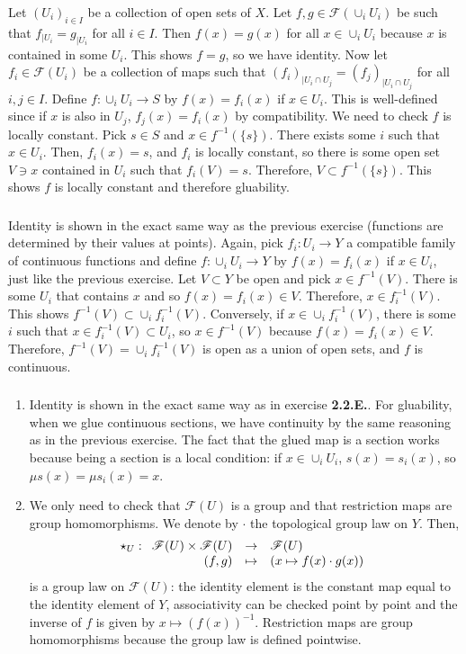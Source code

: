 \documentclass{article}
\newcommand{\applic}[4]{\begin{array}[t]{rcl}
#1 & \to & #2 \\
#3 & \mapsto & #4
\end{array}}
\newcommand{\Fsheaf}{\mathscr{F}}
\newcommand{\exercise}{\subsubsection} %
\begin{document}
\exercise{} Let $(U_i)_{i\in I}$ be a collection of open sets of $X$. Let $f,g \in \Fsheaf(\cup_i U_i)$ be such that $f_{\mid U_i} = g_{\mid U_i}$ for all $i \in I$. Then $f(x) = g(x)$ for all $x \in \cup_i U_i$ because $x$ is contained in some $U_i$. This shows $f = g$, so we have identity. Now let $f_i \in \Fsheaf(U_i)$ be a collection of maps such that $(f_i)_{\mid U_i \cap U_j} = (f_j)_{\mid U_i \cap U_j}$ for all $i,j \in I$. Define $f : \cup_i U_i \to S$ by $f(x) = f_i (x)$ if $x \in U_i$. This is well-defined since if $x$ is also in $U_j$, $f_j(x) = f_i(x)$ by compatibility. We need to check $f$ is locally constant. Pick $s \in S$ and $x \in f^{-1}(\{s\})$. There exists some $i$ such that $x \in U_i$. Then, $f_i(x) = s$, and $f_i$ is locally constant, so there is some open set $V  \ni x$ contained in $U_i$ such that $f_i(V) = s$. Therefore, $V \subset f^{-1}(\{s\})$. This shows $f$ is locally constant and therefore gluability.

\exercise{} Identity is shown in the exact same way as the previous exercise (functions are determined by their values at points). Again, pick $f_i : U_i \to Y$ a compatible family of continuous functions and define $f : \cup_i U_i \to Y$ by $f(x) = f_i(x)$ if $x \in U_i$, just like the previous exercise. Let $V \subset Y$ be open and pick $x \in f^{-1}(V)$. There is some $U_i$ that contains $x$ and so $f(x) = f_i(x) \in V$. Therefore, $x \in f_i^{-1}(V)$. This shows $f^{-1}(V) \subset \cup_i f_i^{-1}(V)$. Conversely, if $x \in \cup_i f_i^{-1}(V)$, there is some $i$ such that $x \in f_i^{-1}(V) \subset U_i$, so $x \in f^{-1}(V)$ because $f(x) = f_i(x) \in V$. Therefore, $f^{-1}(V) = \cup_i f_i^{-1}(V)$ is open as a union of open sets, and $f$ is continuous.

\exercise{} 
\begin{enumerate}
    \item Identity is shown in the exact same way as in exercise \textbf{2.2.E.}. For gluability, when we glue continuous sections, we have continuity by the same reasoning as in the previous exercise. The fact that the glued map is a section works because being a section is a local condition: if $x \in \cup_i U_i$, $s(x) = s_i(x)$, so $\mu s(x) = \mu s_i(x) = x$.
    \item We only need to check that $\Fsheaf (U)$ is a group and that restriction maps are group homomorphisms. We denote by $\cdot$ the topological group law on $Y$. Then, 
    \[\star_U : \applic{\Fsheaf(U) \times \Fsheaf(U)}{\Fsheaf(U)}{(f,g)}{(x \mapsto f(x) \cdot g(x))}\] is a group law on $\Fsheaf(U)$: the identity element is the constant map equal to the identity element of $Y$, associativity can be checked point by point and the inverse of $f$ is given by $x\mapsto (f(x))^{-1}$. Restriction maps are group homomorphisms because the group law is defined pointwise.
\end{enumerate}
\end{document}
